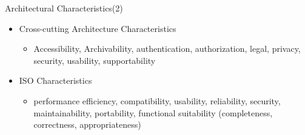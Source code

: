 \documentclass[aspectratio=169, table]{beamer}
\begin{document}
	\begin{frame}{Architectural Characteristics(2)}
		\begin{itemize}

			\item Cross-cutting Architecture Characteristics
			\begin{itemize}
				\item Accessibility, Archivability, authentication, authorization, legal, privacy, security,
				usability, supportability
			\end{itemize}
			\item ISO Characteristics
			\begin{itemize}
				\item performance efficiency, compatibility, usability, reliability, security, maintainability, portability, functional suitability (completeness, correctness, appropriateness)
			\end{itemize}
		\end{itemize}
	\end{frame}
\end{document}
